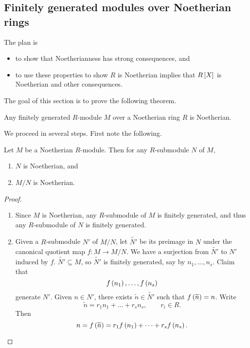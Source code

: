 \pagebreak

\subsection{Finitely generated modules over Noetherian rings}

The plan is
\begin{itemize}
\item to show that Noetherianness has strong consequences, and
\item to use these properties to show $ R $ is Noetherian implies that $ R\sbr{X} $ is Noetherian and other consequences.
\end{itemize}
The goal of this section is to prove the following theorem.

\begin{theorem}
\label{thm:8.2.1}
Any finitely generated $ R $-module $ M $ over a Noetherian ring $ R $ is Noetherian.
\end{theorem}

We proceed in several steps. First note the following.

\begin{proposition}
Let $ M $ be a Noetherian $ R $-module. Then for any $ R $-submodule $ N $ of $ M $,
\begin{enumerate}
\item $ N $ is Noetherian, and
\item $ M / N $ is Noetherian.
\end{enumerate}
\end{proposition}

\begin{proof}
\hfill
\begin{enumerate}
\item Since $ M $ is Noetherian, any $ R $-submodule of $ M $ is finitely generated, and thus any $ R $-submodule of $ N $ is finitely generated.
\item Given a $ R $-submodule $ N' $ of $ M / N $, let $ \widetilde{N'} $ be its preimage in $ N $ under the canonical quotient map $ f : M \to M / N $. We have a surjection from $ \widetilde{N'} $ to $ N' $ induced by $ f $. $ \widetilde{N'} \subseteq M $, so $ \widetilde{N'} $ is finitely generated, say by $ n_1, \dots, n_s $. Claim that
$$ f\br{n_1}, \dots, f\br{n_s} $$
generate $ N' $. Given $ n \in N' $, there exists $ \widetilde{n} \in \widetilde{N'} $ such that $ f\br{\widetilde{n}} = n $. Write
$$ \widetilde{n} = r_1n_1 + \dots + r_sn_s, \qquad r_i \in R. $$
Then
$$ n = f\br{\widetilde{n}} = r_1f\br{n_1} + \dots + r_sf\br{n_s}. $$
\end{enumerate}
\end{proof}

